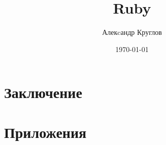\documentclass[a4paper, 12pt, oneside, openany, book]{ncc}
\begin{document}
\author{Алекcандр Круглов}
\title{Ruby}
\date{\today}
\maketitle

{\frontmatter

\tableofcontents}

% 
% 
% 
% 

% 
% 
% 
% 
% 
% 
% 

% 

% 
% 
% 
% 
% 

{\part{Заключение}
}

{\appendix
\part{Приложения}








}
\end{document}
